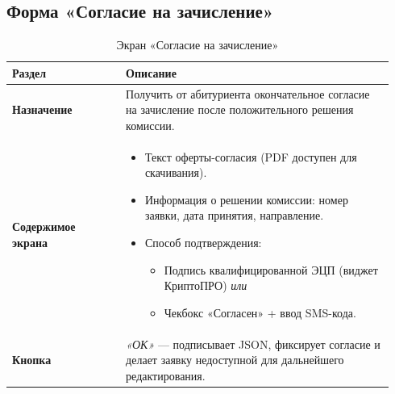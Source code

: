 \documentclass[areasetadvanced]{scrartcl}
\begin{document}
\subsection{Форма «Согласие на зачисление»}
\begin{table}[H]
\caption{Экран «Согласие на зачисление»}
\renewcommand{\arraystretch}{1.2}
\begin{tabular}{|p{0.28\linewidth}|p{0.66\linewidth}|}
\hline
\textbf{Раздел} & \textbf{Описание} \\ \hline
\textbf{Назначение} &
Получить от абитуриента окончательное согласие на зачисление после положительного решения комиссии. \\ \hline

\textbf{Содержимое экрана} &
\begin{itemize}
  \item Текст оферты-согласия (PDF доступен для скачивания).
  \item Информация о решении комиссии: номер заявки, дата принятия, направление.
  \item Способ подтверждения: 
        \begin{itemize}
          \item Подпись квалифицированной ЭЦП (виджет КриптоПРО) \emph{или}
          \item Чекбокс «Согласен» + ввод SMS-кода.
        \end{itemize}
\end{itemize} \\ \hline

\textbf{Кнопка} &
\emph{«ОК»} — подписывает JSON, фиксирует согласие и делает заявку недоступной для дальнейшего редактирования. \\ \hline
\end{tabular}
\end{table}
\end{document}
